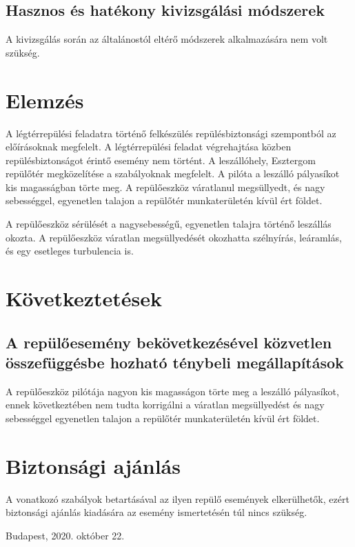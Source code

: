 \documentclass[a4paper,10pt]{article}
\begin{document}
\subsection{Hasznos és hatékony kivizsgálási módszerek}
A kivizsgálás során az általánostól eltérő módszerek alkalmazására nem volt 
szükség.

\section{Elemzés}
A légtérrepülési feladatra történő felkészülés repülésbiztonsági
szempontból az előírásoknak megfelelt. A légtérrepülési feladat
végrehajtása közben repülésbiztonságot érintő esemény nem történt. A 
leszállóhely, Esztergom repülőtér megközelítése a szabályoknak megfelelt. A 
pilóta a leszálló pályasíkot kis magasságban törte meg. A repülőeszköz 
váratlanul megsüllyedt, és nagy sebességgel, egyenetlen talajon a repülőtér 
munkaterületén kívül ért földet.

A repülőeszköz sérülését a nagysebességű, egyenetlen talajra történő 
leszállás okozta. A repülőeszköz váratlan megsüllyedését okozhatta
szélnyírás, leáramlás, és egy esetleges turbulencia is.

\section{Következtetések}
\subsection{A repülőesemény bekövetkezésével közvetlen összefüggésbe
hozható ténybeli megállapítások}
A repülőeszköz pilótája nagyon kis magasságon törte meg a leszálló
pályasíkot, ennek következtében nem tudta korrigálni a váratlan
megsüllyedést és nagy sebességgel egyenetlen talajon a repülőtér
munkaterületén kívül ért földet.

\section{Biztonsági ajánlás}
A vonatkozó szabályok betartásával az ilyen repülő események elkerülhetők, 
ezért biztonsági ajánlás kiadására az esemény ismertetésén túl nincs 
szükség.

\vspace{1cm}

Budapest, 2020. október 22.
\end{document}
